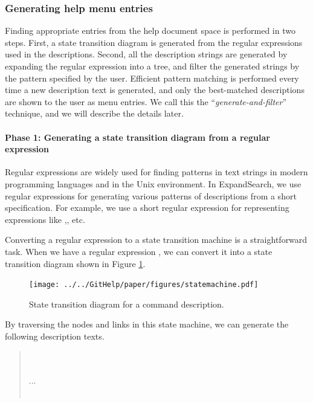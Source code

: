 \documentclass[manuscript,anonymous,review]{acmart}
\def\ES{\textsf{ExpandSearch}}
\begin{document}
\subsubsection{Generating help menu entries}

Finding appropriate entries from the
help document space is
performed in two steps.
First, a state transition diagram is generated from the regular expressions
used in the descriptions.
Second, all the description strings are generated by expanding the regular expression
into a tree, and filter the generated strings by the pattern specified by the user.
Efficient pattern matching is performed every time a new description text is generated,
and only the best-matched descriptions are shown to the user as menu entries.
We call this the ``\textit{generate-and-filter}'' technique,
and we will describe the details later.

\paragraph{Phase 1: Generating a state transition diagram from a regular expression}

Regular expressions are widely used for finding patterns in text strings
in modern programming languages and in the Unix environment.
In {\ES}, we use regular expressions for
generating various patterns of descriptions from a short specification.
For example, we use a short regular expression
for representing expressions like
,, etc.

Converting a regular expression to a state transition machine is a
straightforward task.
When we have a regular expression
, 
we can convert it into a state transition diagram
shown in Figure \ref{statemachine1}.

\begin{figure}[htb]
\texttt{[image: ../../GitHelp/paper/figures/statemachine.pdf]}
\caption{State transition diagram for a  command description.}
\label{statemachine1}
\end{figure}

By traversing the nodes and links in this state machine,
we can generate the following description texts.

\begin{quote}
\small
{} \\
 \\
...\\
\\
\end{quote}
\end{document}
